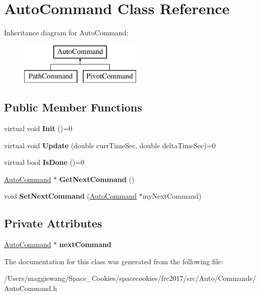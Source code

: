 \hypertarget{class_auto_command}{}\section{Auto\+Command Class Reference}
\label{class_auto_command}
Inheritance diagram for Auto\+Command\+:\begin{figure}[H]
\begin{center}
\leavevmode
\includegraphics[height=2.000000cm]{class_auto_command}
\end{center}
\end{figure}
\subsection*{Public Member Functions}
\begin{DoxyCompactItemize}
\item 
\mbox{\label{class_auto_command_a55e2d94651b71b68589629fb9e5b5e64}} 
virtual void {\bfseries Init} ()=0
\item 
\mbox{\label{class_auto_command_ae396d1857033236f2e1864ea0fff0f69}} 
virtual void {\bfseries Update} (double curr\+Time\+Sec, double delta\+Time\+Sec)=0
\item 
\mbox{\label{class_auto_command_af2a035dbde9903b13b6500f2801ad0be}} 
virtual bool {\bfseries Is\+Done} ()=0
\item 
\mbox{\label{class_auto_command_a13df47b2b27505a229670f1558491473}} 
\hyperlink{class_auto_command}{Auto\+Command} $\ast$ {\bfseries Get\+Next\+Command} ()
\item 
\mbox{\label{class_auto_command_a339b50cd26f092f84c27b06493f320f0}} 
void {\bfseries Set\+Next\+Command} (\hyperlink{class_auto_command}{Auto\+Command} $\ast$my\+Next\+Command)
\end{DoxyCompactItemize}
\subsection*{Private Attributes}
\begin{DoxyCompactItemize}
\item 
\mbox{\label{class_auto_command_a408872b0525fc1b6296d10727612c848}} 
\hyperlink{class_auto_command}{Auto\+Command} $\ast$ {\bfseries next\+Command}
\end{DoxyCompactItemize}


The documentation for this class was generated from the following file\+:\begin{DoxyCompactItemize}
\item 
/\+Users/maggiewang/\+Space\+\_\+\+Cookies/spacecookies/frc2017/src/\+Auto/\+Commands/Auto\+Command.\+h\end{DoxyCompactItemize}
